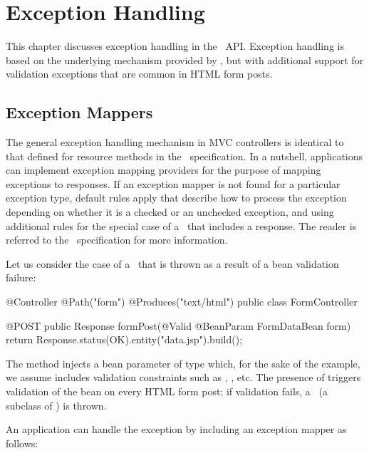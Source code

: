 \chapter{Exception Handling}
\label{exception_handling}

This chapter discusses exception handling in the \mvc\ API. Exception handling is based
on the underlying mechanism provided by \jaxrs, but with additional support for 
validation exceptions that are common in HTML form posts.

\section{Exception Mappers}
\label{exception_mappers}

The general exception handling mechanism in MVC controllers is identical to that defined
for resource methods in the \jaxrs\ specification. In a nutshell, applications can 
implement exception mapping providers for the purpose of mapping exceptions to 
responses. If an exception mapper is not found for a particular exception type, 
default rules apply that describe how to process the exception depending on whether
it is a checked or an unchecked exception, and using additional rules for
the special case of a \WebAppExc\ that includes a response. The reader is referred
to the \jaxrs\ specification for more information.

Let us consider the case of a \ValExc\ that is thrown as a result of a bean validation
failure:

\begin{listing}{1}
@Controller
@Path("form")
@Produces("text/html")
public class FormController {

    @POST
    public Response formPost(@Valid @BeanParam FormDataBean form) {
        return Response.status(OK).entity("data.jsp").build();    
    }
}
\end{listing}

The method  injects a bean parameter of type 
which, for the sake of the example, we assume includes validation constraints
such as , , etc. The presence of  triggers
validation of the bean on every HTML form post; if validation fails, a 
\ConstVioExc\ (a subclass of \ValExc) is thrown. 

An application can handle the exception by including an exception mapper as follows:

